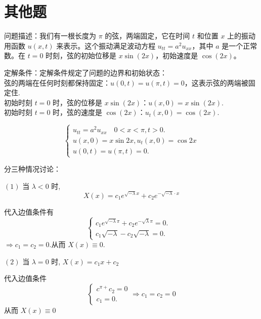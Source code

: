 \section{其他题}
\begin{questions}
\begin{solution}
    问题描述：我们有一根长度为 $\pi$ 的弦，两端固定，它在时间 $t$ 和位置 $x$ 上的振动用函数 $u(x, t)$ 来表示。这个振动满足波动方程 $u_{tt} = a^2 u_{xx}$，其中 $a$ 是一个正常数。在 $t = 0$ 时刻，弦的初始位移是 $x\sin(2x)$，初始速度是 $\cos(2x)$。

定解条件：定解条件规定了问题的边界和初始状态：\\
    弦的两端在任何时刻都保持固定：$u(0, t) = u(\pi, t) = 0$，这表示弦的两端被固定住.\\
    初始时刻 $t = 0$ 时，弦的位移是 $x\sin(2x)$：$u(x, 0) = x\sin(2x)$.\\
    初始时刻 $t = 0$ 时，弦的速度是 $\cos(2x)$：$u_t(x, 0) = \cos(2x)$.

    $$\left\{\begin{array}{l}u_{t t}=a^{2} u_{x x} \quad 0< x< \pi, t>0 . \\ u(x, 0)=x \sin 2 x, u_{t}(x, 0)=\cos 2 x \\ u(0, t)=u(\pi, t)=0 .\end{array}\right. $$
\end{solution}

    \begin{solution}
        分三种情况讨论：

$(1)$ 当 $ \lambda<0 $ 时, $$X(x)=c_{1} e^{\sqrt{-\lambda} x}+c_{2} e^{-\sqrt{-\lambda} \cdot x} $$

代入边值条件有 
$$\left\{\begin{array}{ll}c_{1} e^{\sqrt{-\lambda} \pi}+c_{2} e^{-\sqrt{\lambda} \pi}=0 . &  \\ c_{1} \sqrt{-\lambda}-c_{2} \sqrt{-\lambda}=0 .\end{array}\right. $$
$\Rightarrow c_{1}=c_{2}=0 .$从而 $ X(x) \equiv 0. $

$(2)$ 当 $ \lambda=0 $ 时, $ X(x)=c_{1} x+c_{2} $

代入边值条件 
$$ \left\{\begin{array}{l}c^{\pi+} c_{2}=0 \\ c_{1}=0 .\end{array} \Rightarrow c_{1}=c_{2}=0\right. $$ 
从而 $ X(x) \equiv 0 $


\end{solution}
\end{questions}

